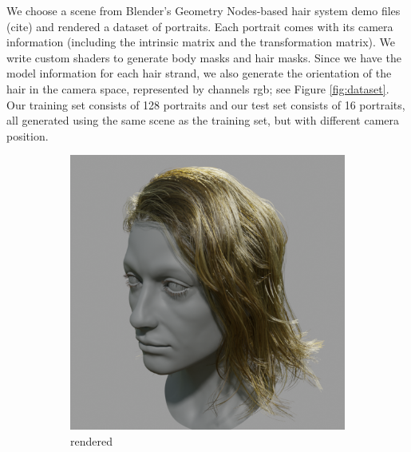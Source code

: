 \documentclass[12pt]{article}
\begin{document}
We choose a scene from Blender's Geometry Nodes-based hair system demo files (cite) and rendered a dataset of portraits. Each portrait comes with its camera information (including the intrinsic matrix and the transformation matrix). We write custom shaders to generate body masks and hair masks. Since we have the model information for each hair strand, we also generate the orientation of the hair in the camera space, represented by channels rgb; see Figure \ref{fig:dataset}. Our training set consists of 128 portraits and our test set consists of 16 portraits, all generated using the same scene as the training set, but with different camera position.
\begin{figure}[h]
\centering
\begin{subfigure}{0.24\textwidth}
\centering
\includegraphics[width=\textwidth]{./images/0009_rendered.png}
\caption{rendered}
\end{subfigure}
\hfill
\begin{subfigure}{0.24\textwidth}
\centering

\end{subfigure}
\end{figure}
\end{document}
